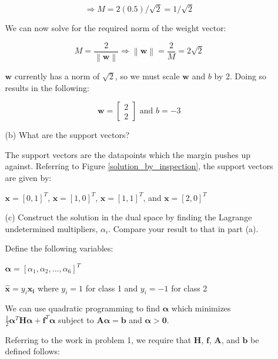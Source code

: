 \documentclass[fleqn]{article}
\newcommand{\norm}[1]{\left \lVert #1 \right \rVert}
\begin{document}
\begin{enumerate}
\begin{enumerate}
		\begin{equation*}
			\Rightarrow M = 2(0.5)/\sqrt{2} = 1/\sqrt{2} 
		\end{equation*}
		
		We can now solve for the required norm of the weight vector:
		
		\begin{equation*}
			M = \frac{2}{\norm{\mathbf{w}}} \Rightarrow \norm{\mathbf{w}} = \frac{2}{M} = 2\sqrt{2}
		\end{equation*}
		
		$\mathbf{w}$ currently has a norm of $\sqrt{2}$, so we must scale $\mathbf{w}$ and $b$ by $2$. Doing so results in the following:
		
		\begin{equation*}
			\mathbf{w} = \begin{bmatrix} 2 \\ 2 \end{bmatrix} \text{ and } b = -3
		\end{equation*}	
		
		\item[(b)] What are the support vectors?
		
		The support vectors are the datapoints which the margin pushes up against. Referring to Figure \ref{solution_by_inspection}, the support vectors are given by:
		
		$\mathbf{x} = [0, 1]^T$, $\mathbf{x} = [1, 0]^T$, $\mathbf{x} = [1, 1]^T$, and $\mathbf{x} = [2, 0]^T$
		
		\item[(c)] Construct the solution in the dual space by finding the Lagrange undetermined multipliers, $\alpha_i$. Compare your result to that in \newline part (a).
		
		Define the following variables:
		
		$\boldsymbol{\alpha} = [\alpha_1, \alpha_2, ..., \alpha_6]^T$
		
		$\mathbf{\hat{x}} = y_i\mathbf{x_i}$ where $y_i = 1$ for class 1 and $y_i = -1$ for class 2
		
		We can use quadratic programming to find $\boldsymbol{\alpha}$ which minimizes \newline $\frac{1}{2}\boldsymbol{\alpha}^T\mathbf{H}\boldsymbol{\alpha} + \mathbf{f}^T\boldsymbol{\alpha}$ subject to $\mathbf{A}\boldsymbol{\alpha} = \mathbf{b}$ and $\boldsymbol{\alpha} > \mathbf{0}$.
		
		Referring to the work in problem 1, we require that $\mathbf{H}$, $\mathbf{f}$, $\mathbf{A}$, and $\mathbf{b}$ be defined follows:		
		

\end{enumerate}
\end{enumerate}
\end{document}
